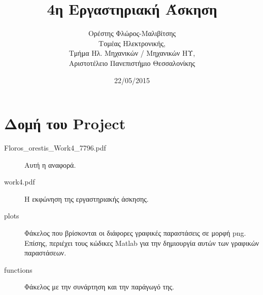
\usepackage{fontspec}
\setmainfont{DejaVu Serif}
\renewcommand{\contentsname}{Περιεχόμενα}
\renewcommand{\listfigurename}{Λίστα Σχημάτων}
\renewcommand{\figurename}{Σχήμα}



\title{4η Εργαστηριακή Άσκηση}
\author{Ορέστης Φλώρος-Μαλιβίτσης\\
  Τομέας Ηλεκτρονικής,\\
  Τμήμα Ηλ. Μηχανικών / Μηχανικών ΗΥ,\\
  Αριστοτέλειο Πανεπιστήμιο Θεσσαλονίκης}
\date{22/05/2015}



\usepackage{syntonly}


\maketitle
\tableofcontents
\listoffigures
\newpage


\chapter*{Δομή του Project} \label{project-structure}

\begin{description}
	\item[Floros\_orestis\_Work4\_7796.pdf] Αυτή η αναφορά.
	\item[work4.pdf] Η εκφώνηση της εργαστηριακής άσκησης.
	\item[plots] Φάκελος που βρίσκονται οι διάφορες γραφικές παραστάσεις σε μορφή png. Επίσης, περιέχει τους κώδικες Matlab για την δημιουργία αυτών των γραφικών παραστάσεων.
	\item[functions] Φάκελος με την συνάρτηση και την παράγωγό της.
\end{description}









